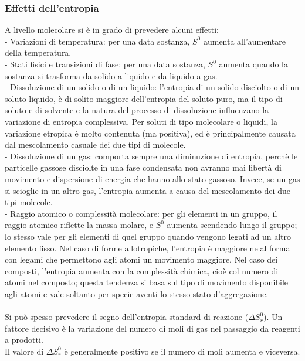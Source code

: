 \subsubsection{Effetti dell'entropia}
A livello molecolare si è in grado di prevedere alcuni effetti:\\
\tab- Variazioni di temperatura: per una data sostanza, $S^0$ aumenta all'aumentare della temperatura.\\
\tab- Stati fisici e transizioni di fase: per una data sostanza, $S^0$ aumenta quando la sostanza si trasforma da solido a liquido e da liquido a gas.\\
\tab- Dissoluzione di un solido o di un liquido: l'entropia di un solido disciolto o di un soluto liquido, è di solito maggiore dell'entropia del soluto puro, ma il tipo di soluto e di solvente e la natura del processo di dissoluzione influenzano la variazione di entropia complessiva. Per soluti di tipo molecolare o liquidi, la variazione etropica è molto contenuta (ma positiva), ed è principalmente causata dal mescolamento casuale dei due tipi di molecole.\\
\tab- Dissoluzione di un gas: comporta sempre una diminuzione di entropia, perchè le particelle gassose disciolte in una fase condensata non avranno mai libertà di movimento e dispersione di energia che hanno allo stato gassoso. Invece, se un gas si scioglie in un altro gas, l'entropia aumenta a causa del mescolamento dei due tipi molecole.\\
\tab- Raggio atomico o complessità molecolare: per gli elementi in un gruppo, il raggio atomico riflette la massa molare, e $S^0$ aumenta scendendo lungo il gruppo; lo stesso vale per gli elementi di quel gruppo quando vengono legati ad un altro elemento fisso. Nel caso di forme allotropiche, l'entropia è maggiore nelal forma con legami che permettono agli atomi un movimento maggiore. Nel caso dei composti, l'entropia aumenta con la complessità chimica, cioè col numero di atomi nel composto; questa tendenza si basa sul tipo di movimento disponibile agli atomi e vale soltanto per specie aventi lo stesso stato d'aggregazione.\\\\
Si può spesso prevedere il segno dell'entropia standard di reazione ($\Delta S^0_r$). Un fattore decisivo è la variazione del numero di moli di gas nel passaggio da reagenti a prodotti. \\
Il valore di $\Delta S_r^0$ è generalmente positivo se il numero di moli aumenta e viceversa.\\
